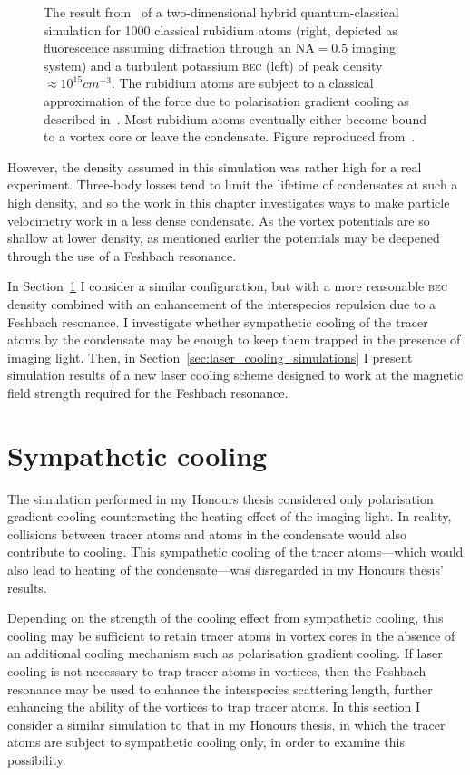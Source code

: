 \begin{figure}
\caption{The result from~\cite{billington_particle_2010} of a two-dimensional hybrid quantum-classical simulation for 1000 classical rubidium atoms (right, depicted as fluorescence assuming diffraction through an $\mathrm{NA}=0.5$ imaging system) and a turbulent potassium \textsc{bec} (left) of peak density $\approx 10^{15}\unit{cm}^{-3}$. The rubidium atoms are subject to a classical approximation of the force due to polarisation gradient cooling as described in~\cite{billington_particle_2010}. Most rubidium atoms eventually either become bound to a vortex core or leave the condensate. Figure reproduced from~\cite{billington_particle_2010}.}%
\label{fig:hybrid}%
\end{figure}

However, the density assumed in this simulation was rather high for a real experiment. Three-body losses tend to limit the lifetime of condensates at such a high density, and so the work in this chapter investigates ways to make particle velocimetry work in a less dense condensate. As the vortex potentials are so shallow at lower density, as mentioned earlier the potentials may be deepened through the use of a Feshbach resonance.

In Section~\ref{sec:sympathetic} I consider a similar configuration, but with a more reasonable \textsc{bec} density combined with an enhancement of the interspecies repulsion due to a Feshbach resonance. I investigate whether sympathetic cooling of the tracer atoms by the condensate may be enough to keep them trapped in the presence of imaging light. Then, in Section~\ref{sec:laser_cooling_simulations} I present simulation results of a new laser cooling scheme designed to work at the magnetic field strength required for the Feshbach resonance.

\section{Sympathetic cooling}\label{sec:sympathetic}

The simulation performed in my Honours thesis considered only polarisation gradient cooling counteracting the heating effect of the imaging light. In reality, collisions between tracer atoms and atoms in the condensate would also contribute to cooling. This sympathetic cooling of the tracer atoms---which would also lead to heating of the condensate---was disregarded in my Honours thesis' results. 

Depending on the strength of the cooling effect from sympathetic cooling, this cooling may be sufficient to retain tracer atoms in vortex cores in the absence of an additional cooling mechanism such as polarisation gradient cooling. If laser cooling is not necessary to trap tracer atoms in vortices, then the Feshbach resonance may be used to enhance the interspecies scattering length, further enhancing the ability of the vortices to trap tracer atoms. In this section I consider a similar simulation to that in my Honours thesis, in which the tracer atoms are subject to sympathetic cooling only, in order to examine this possibility.

